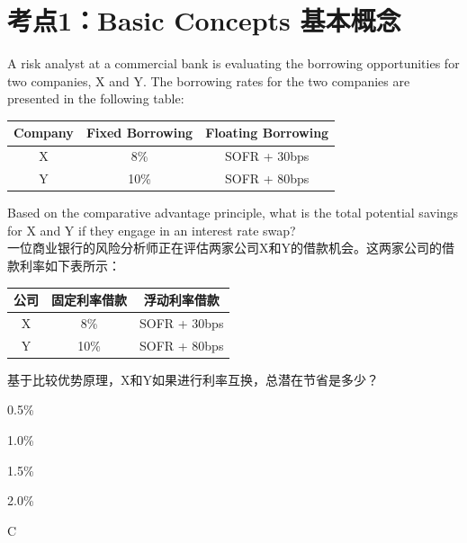 \documentclass{article}
\newcounter{question} %
\begin{document}
 \tableofcontents %
\newpage




\section{考点1：Basic Concepts 基本概念}
\setcounter{question}{0}
\begin{question}
    A risk analyst at a commercial bank is evaluating the borrowing opportunities for two companies, X and Y. The borrowing rates for the two companies are presented in the following table:
    \begin{center}
    \begin{tabular}{|c|c|c|}
    \hline
    Company & Fixed Borrowing & Floating Borrowing \\
    \hline
    X & 8\% & SOFR + 30bps \\
    \hline
    Y & 10\% & SOFR + 80bps \\
    \hline
    \end{tabular}
    \end{center}
    Based on the comparative advantage principle, what is the total potential savings for X and Y if they engage in an interest rate swap?
    \\    一位商业银行的风险分析师正在评估两家公司X和Y的借款机会。这两家公司的借款利率如下表所示：
    \begin{center}
    \begin{tabular}{|c|c|c|}
    \hline
    公司 & 固定利率借款 & 浮动利率借款 \\
    \hline
    X & 8\% & SOFR + 30bps \\
    \hline
    Y & 10\% & SOFR + 80bps \\
    \hline
    \end{tabular}
    \end{center}
    基于比较优势原理，X和Y如果进行利率互换，总潜在节省是多少？
    \end{question}
    
    \begin{choices}
        \item 0.5\%
        \item 1.0\%
        \item 1.5\%
        \item 2.0\%
    \end{choices}
    
    \begin{correctanswer}
    C
    \end{correctanswer}
    
\end{document}
